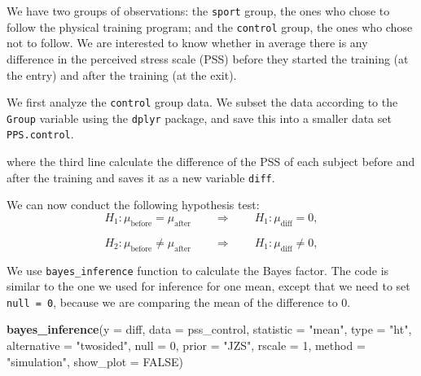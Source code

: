 \documentclass[]{article}
\newenvironment{Shaded}{\begin{snugshade}}{\end{snugshade}}
\newcommand{\KeywordTok}[1]{\textcolor[rgb]{0.13,0.29,0.53}{\textbf{#1}}}
\newcommand{\DataTypeTok}[1]{\textcolor[rgb]{0.13,0.29,0.53}{#1}}
\newcommand{\DecValTok}[1]{\textcolor[rgb]{0.00,0.00,0.81}{#1}}
\newcommand{\StringTok}[1]{\textcolor[rgb]{0.31,0.60,0.02}{#1}}
\newcommand{\OtherTok}[1]{\textcolor[rgb]{0.56,0.35,0.01}{#1}}
\newcommand{\OperatorTok}[1]{\textcolor[rgb]{0.81,0.36,0.00}{\textbf{#1}}}
\newcommand{\NormalTok}[1]{#1}
\begin{document}
We have two groups of observations: the \texttt{sport} group, the ones
who chose to follow the physical training program; and the
\texttt{control} group, the ones who chose not to follow. We are
interested to know whether in average there is any difference in the
perceived stress scale (PSS) before they started the training (at the
entry) and after the training (at the exit).

We first analyze the \texttt{control} group data. We subset the data
according to the \texttt{Group} variable using the \texttt{dplyr}
package, and save this into a smaller data set \texttt{PPS.control}.

\begin{Shaded}
\end{Shaded}

where the third line calculate the difference of the PSS of each subject
before and after the training and saves it as a new variable
\texttt{diff}.

We can now conduct the following hypothesis test:
\[ H_1: \mu_{\text{before}} = \mu_{\text{after}}\qquad \Longrightarrow \qquad H_1: \mu_{\text{diff}} = 0, \]

\[ H_2: \mu_{\text{before}} \neq \mu_{\text{after}}\qquad \Longrightarrow \qquad H_1: \mu_{\text{diff}} \neq 0, \]

We use \texttt{bayes\_inference} function to calculate the Bayes factor.
The code is similar to the one we used for inference for one mean,
except that we need to set \texttt{null\ =\ 0}, because we are comparing
the mean of the difference to 0.

\begin{Shaded}
\begin{Highlighting}[]
\KeywordTok{bayes_inference}\NormalTok{(}\DataTypeTok{y =}\NormalTok{ diff, }\DataTypeTok{data =}\NormalTok{ pss_control, }
                \DataTypeTok{statistic =} \StringTok{"mean"}\NormalTok{,}
                \DataTypeTok{type =} \StringTok{"ht"}\NormalTok{, }\DataTypeTok{alternative =} \StringTok{"twosided"}\NormalTok{, }\DataTypeTok{null =} \DecValTok{0}\NormalTok{, }
                \DataTypeTok{prior =} \StringTok{"JZS"}\NormalTok{, }\DataTypeTok{rscale =} \DecValTok{1}\NormalTok{, }
                \DataTypeTok{method =} \StringTok{"simulation"}\NormalTok{, }\DataTypeTok{show_plot =} \OtherTok{FALSE}\NormalTok{)}
\end{Highlighting}
\end{Shaded}
\end{document}
